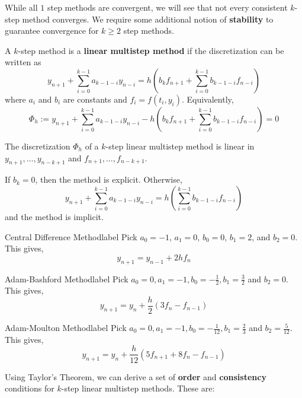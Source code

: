 \NewLine

\noindent While all $1$ step methods are convergent, we will see that not every consistent $k$-step method converges. We require some additional notion of \textbf{stability} to guarantee convergence for $k \geq 2$ step methods.

\begin{defn}
	A $k$-step method is a \textbf{linear multistep method} if the discretization can be written as
	\[y_{n+1}+\sum_{i=0}^{k-1} a_{k-1-i} y_{n-i}=h\left(b_k f_{n+1}+\sum_{i=0}^{k-1} b_{k-1-i} f_{n-i}\right)\]
	where $a_i$ and $b_i$ are constants and $f_i = f(t_i, y_i)$. Equivalently, 
	\[\Phi_h:=y_{n+1}+\sum_{i=0}^{k-1} a_{k-1-i} y_{n-i}-h\left(b_k f_{n+1}+\sum_{i=0}^{k-1} b_{k-1-i} f_{n-i}\right)=0\]
\end{defn}

\begin{rmk}
	The discretization $\Phi_h$ of a $k$-step linear multistep method is linear in $y_{n+1}, \ldots, y_{n-k+1}$ and $f_{n+1}, \ldots, f_{n-k+1}$.
\end{rmk}

\begin{rmk}
	If $b_k = 0$, then the method is explicit. Otherwise,
	\[y_{n+1}+\sum_{i=0}^{k-1} a_{k-1-i} y_{n-i}=h\left(\sum_{i=0}^{k-1} b_{k-1-i} f_{n-i}\right)\]
	and the method is implicit.
\end{rmk}

\begin{ex}{Central Difference Method}{label}
	Pick $a_0 = -1$, $a_1 = 0$, $b_0 = 0$, $b_1 = 2$, and $b_2 = 0$. This gives,
	\[y_{n+1}=y_{n-1}+2 h f_n\]
\end{ex}

\begin{ex}{Adam-Bashford Method}{label}
	Pick $a_0=0, a_1=-1, b_0=-\frac{1}{2}, b_1=\frac{3}{2}$ and $b_2=0$. This gives,
	\[y_{n+1}=y_n+\frac{h}{2}\left(3 f_n-f_{n-1}\right)\]
\end{ex}

\begin{ex}{Adam-Moulton Method}{label}
	Pick $a_0=0, a_1=-1, b_0=-\frac{1}{12}, b_1=\frac{2}{3}$ and $b_2=\frac{5}{12}$. This gives,
	\[y_{n+1}=y_n+\frac{h}{12}\left(5 f_{n+1}+8 f_n-f_{n-1}\right)\]
\end{ex}

\NewLine

\noindent Using Taylor's Theorem, we can derive a set of \textbf{order} and \textbf{consistency} conditions for $k$-step linear multistep methods. These are:

